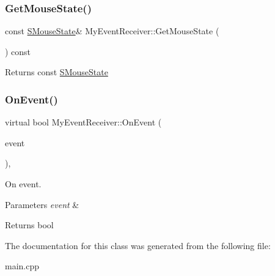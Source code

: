 \subsubsection{\texorpdfstring{Get\+Mouse\+State()}{GetMouseState()}}
{\footnotesize\ttfamily const \hyperlink{struct_s_mouse_state}{S\+Mouse\+State}\& My\+Event\+Receiver\+::\+Get\+Mouse\+State (\begin{DoxyParamCaption}\item[{void}]{ }\end{DoxyParamCaption}) const\hspace{0.3cm}{\ttfamily [inline]}}

\begin{DoxyReturn}{Returns}
const \hyperlink{struct_s_mouse_state}{S\+Mouse\+State} 
\end{DoxyReturn}
\mbox{\label{class_my_event_receiver_aea4aee9bbe18deae0c33ad4c6c32d7f1}} 
\subsubsection{\texorpdfstring{On\+Event()}{OnEvent()}}
{\footnotesize\ttfamily virtual bool My\+Event\+Receiver\+::\+On\+Event (\begin{DoxyParamCaption}\item[{const S\+Event \&}]{event }\end{DoxyParamCaption})\hspace{0.3cm}{\ttfamily [inline]}, {\ttfamily [virtual]}}



On event. 


\begin{DoxyParams}{Parameters}
{\em event} & \\
\hline
\end{DoxyParams}
\begin{DoxyReturn}{Returns}
bool 
\end{DoxyReturn}


The documentation for this class was generated from the following file\+:\begin{DoxyCompactItemize}
\item 
main.\+cpp\end{DoxyCompactItemize}
